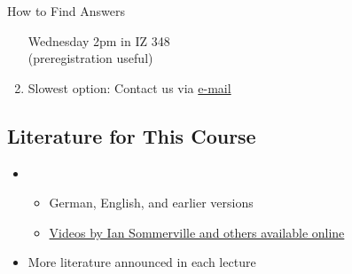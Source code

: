 \begin{frame}{\insertsubsection}
\begin{fancycolumns}[animation=none]
\begin{definition}{How to Find Answers}
\begin{enumerate}
					Wednesday 2pm in IZ 348\\(preregistration useful)
				\item<+-> Slowest option: Contact us via  \href{mailto:sebastian.krieter@uni-paderborn.de?cc=t.thuem@tu-braunschweig.de&subject=[SE1]}{e-mail}
			\end{enumerate}
		\end{definition}
	\end{fancycolumns}
\end{frame}

\subsection{Literature for This Course}
\begin{frame}{\insertsubsection}
	\begin{fancycolumns}[animation=none]
		\centering{}
		\nextcolumn
		\begin{definition}{\mysource{\sommerville}}
			\begin{itemize}
				\item {}
				\begin{itemize}
					\item German, English, and earlier versions
					\item \href{https://software-engineering-book.com/videos/}{Videos by Ian Sommerville and others available online}
				\end{itemize}
				\item More literature announced in each lecture
			\end{itemize}
		\end{definition}
	\end{fancycolumns}
\end{frame}
